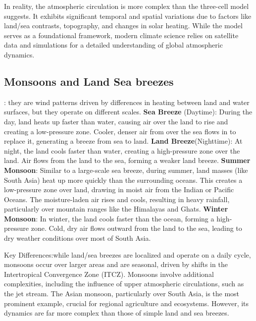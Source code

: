 In reality, the atmospheric circulation is more complex than the three-cell model suggests. It exhibits significant temporal and spatial variations due to factors like land/sea contrasts, topography, and changes in solar heating. While the model serves as a foundational framework, modern climate science relies on satellite data and simulations for a detailed understanding of global atmospheric dynamics.

\subsection{Monsoons and Land Sea breezes}: they are wind patterns driven by differences in heating between land and water surfaces, but they operate on different scales.
\newline \textbf{Sea Breeze} (Daytime): During the day, land heats up faster than water, causing air over the land to rise and creating a low-pressure zone. Cooler, denser air from over the sea flows in to replace it, generating a breeze from sea to land. \newline \textbf{Land Breeze}(Nighttime): At night, the land cools faster than water, creating a high-pressure zone over the land. Air flows from the land to the sea, forming a weaker land breeze.
\newline \textbf{Summer Monsoon}: Similar to a large-scale sea breeze, during summer, land masses (like South Asia) heat up more quickly than the surrounding oceans. This creates a low-pressure zone over land, drawing in moist air from the Indian or Pacific Oceans. The moisture-laden air rises and cools, resulting in heavy rainfall, particularly over mountain ranges like the Himalayas and Ghats. \newline \textbf{Winter Monsoon}: In winter, the land cools faster than the ocean, forming a high-pressure zone. Cold, dry air flows outward from the land to the sea, leading to dry weather conditions over most of South Asia.




\newline Key Differences:while land/sea breezes are localized and operate on a daily cycle, monsoons occur over larger areas and are seasonal, driven by shifts in the Intertropical Convergence Zone (ITCZ).
Monsoons involve additional complexities, including the influence of upper atmospheric circulations, such as the jet stream.
The Asian monsoon, particularly over South Asia, is the most prominent example, crucial for regional agriculture and ecosystems. However, its dynamics are far more complex than those of simple land and sea breezes.

